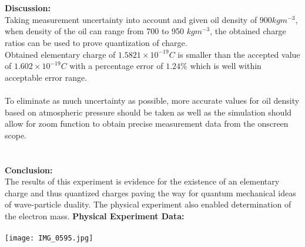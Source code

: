 \documentclass[12pt, letterpaper]{report}
\begin{document}
\\\\
\textbf{Discussion:}\\
Taking measurement uncertainty into account and given oil density of $900kgm^{-3}$, when density of the oil can range from 700 to 950 $kgm^{-3}$, the obtained charge ratios can be used to prove quantization of charge.\\
Obtained elementary charge of $1.5821\times 10^{-19} C$ is smaller than the accepted value of $1.602\times 10^{-19}C$ with a percentage error of $1.24\%$ which is well within acceptable error range. \\\\
To eliminate as much uncertainty as possible, more accurate values for oil density based on atmospheric pressure should be taken as well as the simulation should allow for zoom function to obtain precise measurement data from the onscreen scope.
\\\\\\
\textbf{Conclusion:}\\
The results of this experiment is evidence for the existence of an elementary charge and thus quantized charges paving the way for quantum mechanical ideas of wave-particle duality. The physical experiment also enabled determination of the electron mass.        
\newpage
\noindent \textbf{Physical Experiment Data:}\\\\
\texttt{[image: IMG\_0595.jpg]}
\end{document}
